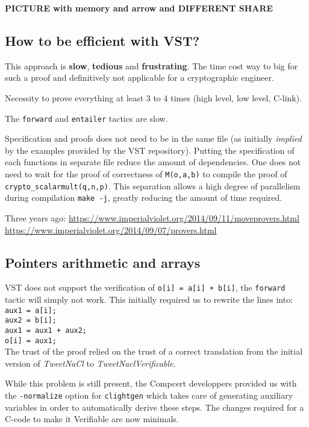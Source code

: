 \textbf{PICTURE with memory and arrow and DIFFERENT SHARE}

\subsection{How to be efficient with VST?}

This approach is \textbf{slow}, \textbf{tedious} and \textbf{frustrating}.
The time cost way to big for such a proof and definitively not applicable for a
cryptographic engineer.

Necessity to prove everything at least 3 to 4 times (high level, low level, C-link).

The \texttt{forward} and \texttt{entailer} tactics are slow.

Specification and proofs does not need to be in the same file (as initially \textit{implied}
by the examples provided by the VST repository). Putting the specification of each
functions in separate file reduce the amount of dependencies. One does not need
to wait for the proof of correctness of \texttt{M(o,a,b)} to compile the proof of \texttt{crypto\_scalarmult(q,n,p)}.
This separation allows a high degree of parallelism during compilation \texttt{make -j},
greatly reducing the amount of time required.

Three years ago:
\url{https://www.imperialviolet.org/2014/09/11/moveprovers.html}
\url{https://www.imperialviolet.org/2014/09/07/provers.html}

\subsection{Pointers arithmetic and arrays}

VST does not support the verification of \texttt{o[i] = a[i] + b[i]},
the \texttt{forward} tactic will simply not work. This initially required us to
rewrite the lines into:\\
\texttt{aux1 = a[i];\\
aux2 = b[i];\\
aux1 = aux1 + aux2;\\
o[i] = aux1;}\\
The trust of the proof relied on the trust of a correct translation from the
initial version of \textit{TweetNaCl} to \textit{TweetNaclVerificable}.

While this problem is still present, the Compcert developpers provided us with
the \texttt{-normalize} option for \texttt{clightgen} which takes care of
generating auxiliary variables in order to automatically derive these steps.
The changes required for a C-code to make it Verifiable are now minimals.

